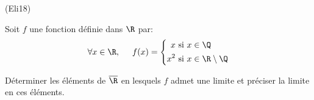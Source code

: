 \begin{tiny}(Eli18)\end{tiny} Soit $f$ une fonction définie dans $\R$ par:
\begin{displaymath}
\forall x\in \R, \hspace{0.5cm} f(x)=
\left\lbrace 
\begin{aligned}
 x &\text{ si } x\in \Q \\
 x^2 &\text{ si } x\in \R\setminus \Q
\end{aligned}
\right. 
\end{displaymath}

Déterminer les éléments de $\overline{\R}$ en lesquels $f$ admet une limite et préciser la limite en ces éléments.